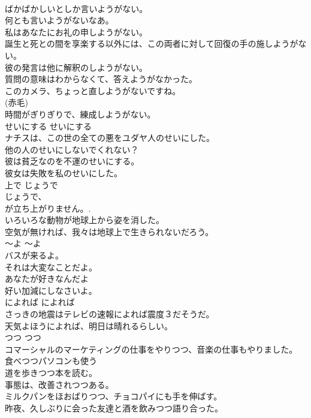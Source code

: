 \documentclass[8pt]{extreport}
\begin{document}
\begin{CJK}{UTF8}{min}
\\	ばかばかしいとしか言いようがない。   
\\	何とも言いようがないなあ。   
\\	私はあなたにお礼の申しようがない。  
\\	誕生と死との間を享楽する以外には、この両者に対して回復の手の施しようがない。   
\\	彼の発言は他に解釈のしようがない。   
\\	質問の意味はわからなくて、答えようがなかった。  
\\	このカメラ、ちょっと直しようがないですね。  
\\	(赤毛)
\\	時間がぎりぎりで、練成しようがない。  
\\	せいにする	せいにする	
\\	ナチスは、この世の全ての悪をユダヤ人のせいにした。   
\\	他の人のせいにしないでくれない？  
\\	彼は貧乏なのを不運のせいにする。   
\\	彼女は失敗を私のせいにした。   
\\	上で	じょうで	
\\	じょうで、 
\\	が立ち上がりません。.   
\\	いろいろな動物が地球上から姿を消した。  
\\	空気が無ければ、我々は地球上で生きられないだろう。  
\\	〜よ	〜よ	
\\	バスが来るよ。
\\	それは大変なことだよ。  
\\	あなたが好きなんだよ  
\\	好い加減にしなさいよ。  
\\	によれば	によれば	
\\	さっきの地震はテレビの速報によれば震度３だそうだ。   
\\	天気よほうによれば、明日は晴れるらしい。   
\\	つつ	つつ	
\\	コマーシャルのマーケティングの仕事をやりつつ、音楽の仕事もやりました。  
\\	食べつつパソコンも使う  
\\	道を歩きつつ本を読む。  
\\	事態は、改善されつつある。  
\\	ミルクパンをほおばりつつ、チョコパイにも手を伸ばす。  
\\	昨夜、久しぶりに会った友達と酒を飲みつつ語り合った。   

\end{CJK}
\end{document}
